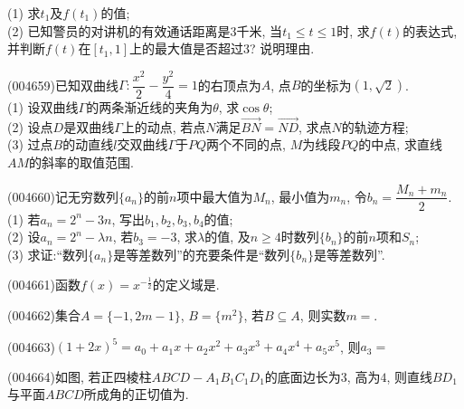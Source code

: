 (1) 求$t_1$及$f(t_1)$的值;\\
(2) 已知警员的对讲机的有效通话距离是$3$千米, 当$t_1\le t\le 1$时, 求$f(t)$的表达式, 并判断$f(t)$在$[t_1,1]$上的最大值是否超过$3$? 说明理由.
\item (004659)已知双曲线$\Gamma:\dfrac{x^2}2-\dfrac{y^2}4=1$的右顶点为$A$, 点$B$的坐标为$(1,\sqrt 2)$.\\
(1) 设双曲线$\Gamma$的两条渐近线的夹角为$\theta$, 求$\cos\theta$;\\
(2) 设点$D$是双曲线$\Gamma$上的动点, 若点$N$满足$\overrightarrow{BN}=\overrightarrow{ND}$, 求点$N$的轨迹方程;\\
(3) 过点$B$的动直线$l$交双曲线$\Gamma$于$PQ$两个不同的点, $M$为线段$PQ$的中点, 求直线$AM$的斜率的取值范围.
\item (004660)记无穷数列$\{a_n\}$的前$n$项中最大值为$M_n$, 最小值为$m_n$, 令$b_n=\dfrac{M_n+m_n}{2}$.\\
(1) 若$a_n=2^n-3n$, 写出$b_1,b_2,b_3,b_4$的值;\\
(2) 设$a_n=2^n-\lambda n$, 若$b_3=-3$, 求$\lambda$的值, 及$n\ge 4$时数列$\{b_n\}$的前$n$项和$S_n$;\\
(3) 求证:``数列$\{a_n\}$是等差数列''的充要条件是``数列$\{b_n\}$是等差数列''.
\item (004661)函数$f(x)={x^{-\frac 12}}$的定义域是.
\item (004662)集合$A=\{-1, 2m-1\}$, $B=\{m^2\}$, 若$B\subseteq A$, 则实数$m=$.
\item (004663)$(1+2x)^5=a_0+a_1x+a_2x^2+a_3x^3+a_4x^4+a_5x^5$, 则$a_3=$
\item (004664)如图, 若正四棱柱$ABCD-A_1B_1C_1D_1$的底面边长为$3$, 高为$4$, 则直线$BD_1$与平面$ABCD$所成角的正切值为.
\begin{center}
\end{center}
